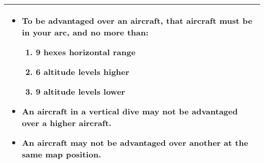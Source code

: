 
\begin{onecolumntablefloat}
\begin{onecolumntable}

\begin{tabularx}{\linewidth}{L}
\toprule
\begin{itemize}
\item
To be advantaged over an aircraft, that aircraft must be in your  arc, and no more than:
\begin{enumerate}[align=left, labelwidth=0.7em, label=\alph*.]
\item 9 hexes horizontal range
\item 6 altitude levels higher
\item 9 altitude levels lower
\end{enumerate}
\item 
An aircraft in a vertical dive may not be advantaged over a higher aircraft.
\item 
An aircraft may not be advantaged over another at the same map position.
\end{itemize}\\[-1ex]
\bottomrule
\end{tabularx}
\end{onecolumntable}
\end{onecolumntablefloat}
